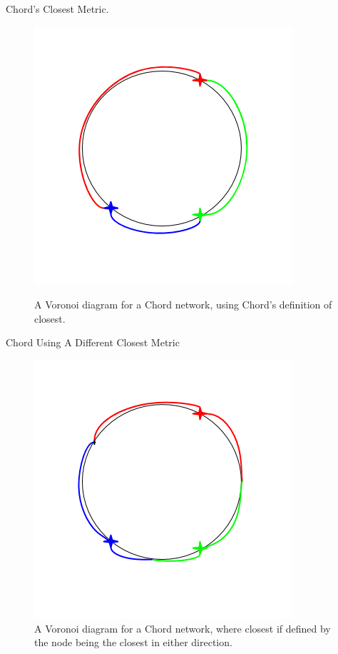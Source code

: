 \documentclass[11pt]{beamer}
\begin{document}


\begin{frame}{Chord's Closest Metric.}
	\begin{figure}
		\centering
		
		\caption{A Voronoi diagram for a Chord network, using Chord's definition of closest.}
		\includegraphics[width=0.3\linewidth]{figs/voro-chord-normal}
		\label{fig:voro-chord-normal}
	\end{figure}
	
\end{frame}
\begin{frame}{Chord Using A Different Closest Metric}
	\begin{figure}
		\centering
		\caption{A Voronoi diagram for a Chord network, where closest if defined by the node being the closest in either direction.}
		\includegraphics[width=0.5\linewidth]{figs/voro-chord-alternative}
		
		\label{fig:voro-chord-alternative}
	\end{figure}
\end{frame}
\end{document}
